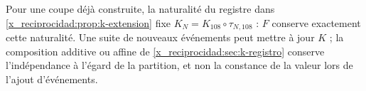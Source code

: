 Pour une coupe déjà construite, la naturalité du registre dans \cref{x_reciprocidad:prop:k-extension} fixe \(K_N=K_{108}\circ\tau_{N,108}\) : \(F\) conserve exactement cette naturalité. Une suite de nouveaux événements peut mettre à jour \(K\) ; la composition additive ou affine de \cref{x_reciprocidad:sec:k-registro} conserve l’indépendance à l’égard de la partition, et non la constance de la valeur lors de l’ajout d’événements.
